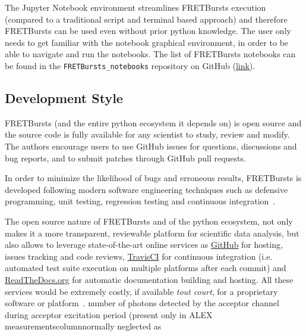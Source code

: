The Jupyter Notebook environment streamlines FRETBursts execution (compared to
a traditional script and terminal based approach) and therefore
FRETBursts can be used even without prior python knowledge.
The user only needs to get familiar with the
notebook graphical environment, in order to be able to navigate and run the notebooks.
The list of FRETBursts notebooks can be found in the
\verb|FRETBursts_notebooks| repository on GitHub
(\href{https://github.com/tritemio/FRETBursts\_notebooks}{link}).


\subsection{Development Style}

FRETBursts (and the entire python ecosystem it depends on) is open source
and the source code is fully available for any scientist to study,
review and modify.
The authors encourage users to use GitHub issues for questions, discussions
and bug reports, and to submit patches through GitHub pull requests.

In order to minimize the likelihood of bugs and erroneous results, FRETBursts is developed
following modern software engineering techniques such
as defensive programming, unit testing, regression testing and continuous integration~\cite{Wilson_2014}.

The open source nature of FRETBursts and of the python ecosystem,
not only makes it a more transparent, reviewable platform
for scientific data analysis, but also allows
to leverage state-of-the-art online services as \href{http://https://github.com}{GitHub} for hosting,
issues tracking and code reviews,
\href{https://travis-ci.org}{TravisCI} for continuous integration
(i.e. automated test suite execution on multiple platforms after each commit)
and \href{https://readthedocs.org/}{ReadTheDocs.org} for automatic documentation building and hosting.
All these services would be extremely costly, if available \textit{tout court},
for a proprietary software or platform~\cite{Freeman_2015}.
number of photons detected by the acceptor channel
during acceptor excitation period (present only in ALEX measurementscolumnnormally neglected as
